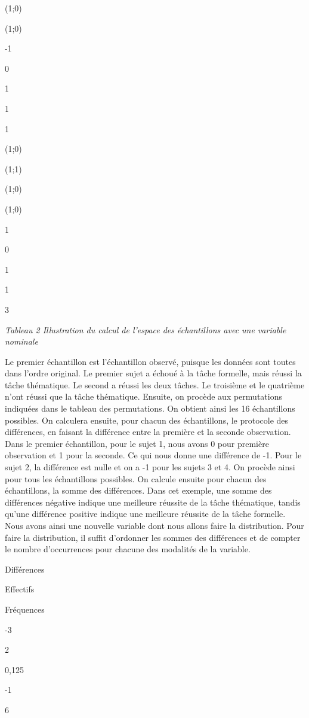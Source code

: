 \documentclass[]{book}
\theoremstyle{definition}
\theoremstyle{definition}
\theoremstyle{definition}
\theoremstyle{remark}
\begin{document}
(1;0)

(1;0)

-1

0

1

1

1

(1;0)

(1;1)

(1;0)

(1;0)

1

0

1

1

3

\emph{Tableau 2 Illustration du calcul de l'espace des échantillons avec
une variable nominale}

Le premier échantillon est l'échantillon observé, puisque les données
sont toutes dans l'ordre original. Le premier sujet a échoué à la tâche
formelle, mais réussi la tâche thématique. Le second a réussi les deux
tâches. Le troisième et le quatrième n'ont réussi que la tâche
thématique. Ensuite, on procède aux permutations indiquées dans le
tableau des permutations. On obtient ainsi les 16 échantillons
possibles. On calculera ensuite, pour chacun des échantillons, le
protocole des différences, en faisant la différence entre la première et
la seconde observation. Dans le premier échantillon, pour le sujet 1,
nous avons 0 pour première observation et 1 pour la seconde. Ce qui nous
donne une différence de -1. Pour le sujet 2, la différence est nulle et
on a -1 pour les sujets 3 et 4. On procède ainsi pour tous les
échantillons possibles. On calcule ensuite pour chacun des échantillons,
la somme des différences. Dans cet exemple, une somme des différences
négative indique une meilleure réussite de la tâche thématique, tandis
qu'une différence positive indique une meilleure réussite de la tâche
formelle. Nous avons ainsi une nouvelle variable dont nous allons faire
la distribution. Pour faire la distribution, il suffit d'ordonner les
sommes des différences et de compter le nombre d'occurrences pour
chacune des modalités de la variable.

Différences

Effectifs

Fréquences

-3

2

0,125

-1

6
\end{document}

